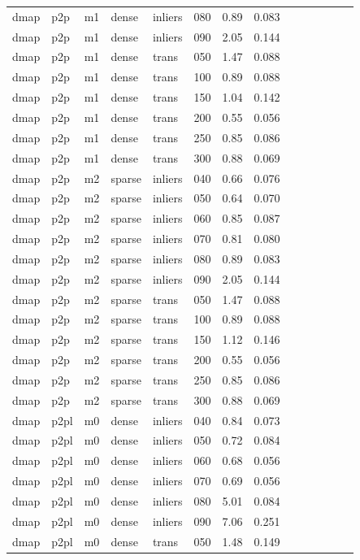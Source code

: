 \begin{table}[htbp]
\begin{tabular}{llllllrrrrrrrr}
  dmap & p2p & m1 & dense & inliers & 080 & 0.89 & 0.083 \\
  dmap & p2p & m1 & dense & inliers & 090 & 2.05 & 0.144 \\
  dmap & p2p & m1 & dense & trans & 050 & 1.47 & 0.088 \\
  dmap & p2p & m1 & dense & trans & 100 & 0.89 & 0.088 \\
  dmap & p2p & m1 & dense & trans & 150 & 1.04 & 0.142 \\
  dmap & p2p & m1 & dense & trans & 200 & 0.55 & 0.056 \\
  dmap & p2p & m1 & dense & trans & 250 & 0.85 & 0.086 \\
  dmap & p2p & m1 & dense & trans & 300 & 0.88 & 0.069 \\
  dmap & p2p & m2 & sparse & inliers & 040 & 0.66 & 0.076 \\
  dmap & p2p & m2 & sparse & inliers & 050 & 0.64 & 0.070 \\
  dmap & p2p & m2 & sparse & inliers & 060 & 0.85 & 0.087 \\
  dmap & p2p & m2 & sparse & inliers & 070 & 0.81 & 0.080 \\
  dmap & p2p & m2 & sparse & inliers & 080 & 0.89 & 0.083 \\
  dmap & p2p & m2 & sparse & inliers & 090 & 2.05 & 0.144 \\
  dmap & p2p & m2 & sparse & trans & 050 & 1.47 & 0.088 \\
  dmap & p2p & m2 & sparse & trans & 100 & 0.89 & 0.088 \\
  dmap & p2p & m2 & sparse & trans & 150 & 1.12 & 0.146 \\
  dmap & p2p & m2 & sparse & trans & 200 & 0.55 & 0.056 \\
  dmap & p2p & m2 & sparse & trans & 250 & 0.85 & 0.086 \\
  dmap & p2p & m2 & sparse & trans & 300 & 0.88 & 0.069 \\
  dmap & p2pl & m0 & dense & inliers & 040 & 0.84 & 0.073 \\
  dmap & p2pl & m0 & dense & inliers & 050 & 0.72 & 0.084 \\
  dmap & p2pl & m0 & dense & inliers & 060 & 0.68 & 0.056 \\
  dmap & p2pl & m0 & dense & inliers & 070 & 0.69 & 0.056 \\
  dmap & p2pl & m0 & dense & inliers & 080 & 5.01 & 0.084 \\
  dmap & p2pl & m0 & dense & inliers & 090 & 7.06 & 0.251 \\
  dmap & p2pl & m0 & dense & trans & 050 & 1.48 & 0.149 \\

\end{tabular}
\end{table}
